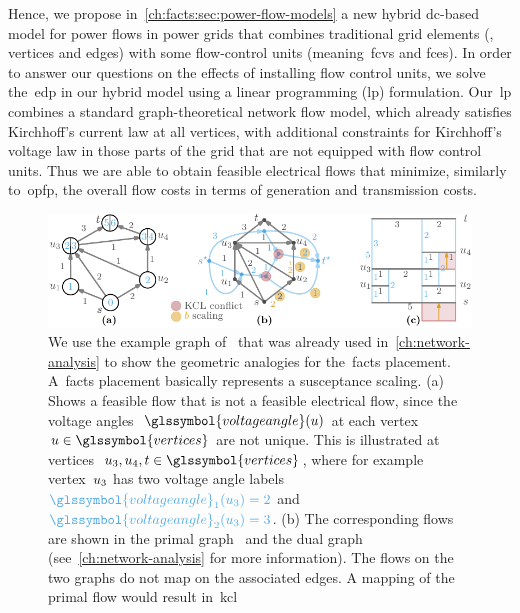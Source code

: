 Hence, we propose in~\cref{ch:facts:sec:power-flow-models} a new hybrid 
\gls{dc}-based model for power flows in power grids that combines traditional
grid elements (\ie, vertices and edges) with some flow-control units
(meaning~\gls{fcv}s and \gls{fce}s). In order to answer our questions on the
effects of installing flow control units, we solve the~\gls{edp} in our hybrid
model using a linear programming (\gls{lp}) formulation. Our~\gls{lp} combines a
standard graph-theoretical network flow model, which already satisfies
Kirchhoff's current law at all vertices, with additional constraints for
Kirchhoff's voltage law in those parts of the grid that are not equipped with
flow control units. Thus we are able to obtain feasible electrical flows that
minimize, similarly to~\gls{opfp}, the overall flow costs in terms of generation
and transmission costs.
% 
\begin{figure}
    \includegraphics{networkAnalyzes/figures/AnalogiesSusceptanceScaling.pdf}
    \caption[Geometric interpretation of the susceptance scaling.]{%
    We use the example graph of~\textcite[p.18]{Fel13} that was already used
    in~\cref{ch:network-analysis} to show the geometric analogies for
    the~\gls{facts} placement. A~\gls{facts} placement basically represents a
    susceptance scaling. (a) Shows a feasible flow that is not a feasible
    electrical flow, since the \textcolor{THETA}{voltage
    angles~$\glssymbol{voltageangle} (\vertexa)$} at each
    vertex~$\vertexa\in\glssymbol{vertices}$ are not unique. This is illustrated
    at vertices~$\vertexa_3, \vertexa_4, \sink \in \glssymbol{vertices}$, where
    for example vertex~$u_3$ has two voltage angle labels~$
    \textcolor{THETA}{\glssymbol{voltageangle}_1(\vertexa_{3}) = 2}$ and~$
    \textcolor{THETA}{\glssymbol{voltageangle}_2(\vertexa_{3}) = 3}$. (b) The
    corresponding flows are shown in the \textcolor{PRIMALGRAPH}{primal
    graph~} and the \textcolor{DUALGRAPH}{dual
    graph~} (see~\cref{ch:network-analysis} for more
    information). The flows on the two graphs do not map on the associated
    edges. A mapping of the primal flow would result in~\gls{kcl}
}
\end{figure}
